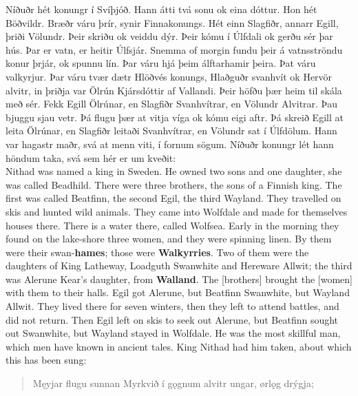 \bookStart

\bva Níðuðr hét konungr í Svíþjóð. \bva Hann átti tvá sonu ok eina dóttur. Hon hét Böðvildr. \bva Bræðr váru þrír, synir Finnakonungs. \bva Hét einn Slagfiðr, annarr Egill, þriði Völundr. \bva Þeir skriðu ok veiddu dýr. Þeir kómu í Úlfdali ok gerðu sér þar hús. \bva Þar er vatn, er heitir Úlfsjár. \bva Snemma of morgin fundu þeir á vatnsströndu konur þrjár, ok spunnu lín. \bva Þar váru hjá þeim álftarhamir þeira. Þat váru valkyrjur. \bva Þar váru tvær dætr Hlöðvés konungs, Hlaðguðr svanhvít ok Hervör alvitr, in þriðja var Ölrún Kjársdóttir af Vallandi. \bva Þeir höfðu þær heim til skála með sér. Fekk Egill Ölrúnar, en Slagfiðr Svanhvítrar, en Völundr Alvitrar. \bva Þau bjuggu sjau vetr. Þá flugu þær at vitja víga ok kómu eigi aftr. \bva Þá skreið Egill at leita Ölrúnar, en Slagfiðr leitaði Svanhvítrar, en Völundr sat í Úlfdölum. \bva Hann var hagastr maðr, svá at menn viti, í fornum sögum. \bva Níðuðr konungr lét hann höndum taka, svá sem hér er um kveðit: \\%

\bvb Nithad was named a king in Sweden. \bvb He owned two sons and one daughter, she was called Beadhild. \bvb There were three brothers, the sons of a Finnish king. \bvb The first was called Beatfinn, the second Egil, the third Wayland. \bvb They travelled on skis and hunted wild animals. They came into Wolfdale and made for themselves houses there. \bvb There is a water there, called Wolfsea. \bvb Early in the morning they found on the lake-shore three women, and they were spinning linen. \bvb By them were their swan-\textbf{hames}; those were \textbf{Walkyrries}. \bvb Two of them were the daughters of King Latheway, Loadguth Swanwhite and Hereware Allwit; the third was Alerune Kear's daughter, from \textbf{Walland}. \bvb The [brothers] brought the [women] with them to their halls. Egil got Alerune, but Beatfinn Swanwhite, but Wayland Allwit. \bvb They lived there for seven winters, then they left to attend battles, and did not return. \bvb Then Egil left on skis to seek out Alerune, but Beatfinn sought out Swanwhite, but Wayland stayed in Wolfdale. \bvb He was the most skillful man, which men have known in ancient tales. \bvb King Nithad had him taken, about which this has been sung: \\

\chapterStart

\begin{verse}
\bva Męyjar flugu sunnan \hld Myrkvið í gǫgnum
alvitr ungar, \hld ørlǫg drýgja; \\%
\end{verse}

